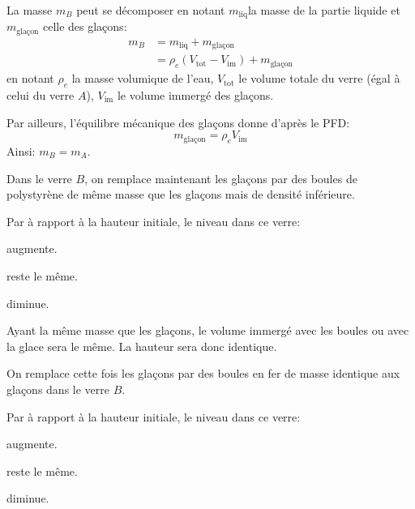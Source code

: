 \reponse{\reponseB{}}
\begin{corrige}
La masse $m_{B}$ peut se décomposer en notant $m_{\text{liq}}$la
masse de la partie liquide et $m_{\text{glaçon}}$ celle des glaçons:
\begin{align*}
m_{B} & =m_{\text{liq}}+m_{\text{glaçon}}\\
 & =\rho_{e}\left(V_{\text{tot}}-V_{\text{im}}\right)+m_{\text{glaçon}}
\end{align*}
 en notant $\rho_{e}$ la masse volumique de l'eau, $V_{\text{tot}}$
le volume totale du verre (égal à celui du verre $A$), $V_{\text{im}}$
le volume immergé des glaçons. 

Par ailleurs, l'équilibre mécanique des glaçons donne d'après le PFD:
\[
m_{\text{glaçon}}=\rho_{e}V_{\text{im}}
\]
Ainsi: $m_{B}=m_{A}$.
\end{corrige}
\begin{enonce}
Dans le verre $B$, on remplace maintenant les glaçons par des boules
de polystyrène de même masse que les glaçons mais de densité inférieure.

Par à rapport à la hauteur initiale, le niveau dans ce verre:

	\begin{listeQCM3Colonnes}
	\item augmente.
	\item reste le même.
	\item diminue.
	\end{listeQCM3Colonnes}
\end{enonce}

\reponse{\reponseB{}}
\begin{corrige}
Ayant la même masse que les glaçons, le volume immergé avec les boules
ou avec la glace sera le même. La hauteur sera donc identique.
\end{corrige}
\begin{enonce}
On remplace cette fois les glaçons par des boules en fer de masse
identique aux glaçons dans le verre $B$. 

Par à rapport à la hauteur initiale, le niveau dans ce verre:

	\begin{listeQCM3Colonnes}
	\item augmente.
	\item reste le même.
	\item diminue. 
	\end{listeQCM3Colonnes}
\end{enonce}

